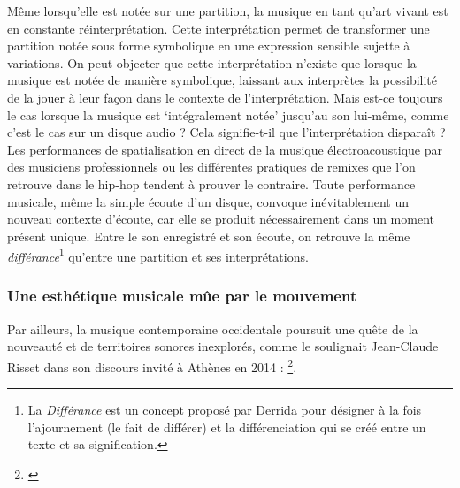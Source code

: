 \noindent Même lorsqu'elle est notée sur une partition, la musique en tant qu'art vivant est en constante réinterprétation. Cette interprétation permet de transformer une partition notée sous forme symbolique en une expression sensible sujette à variations. On peut objecter que cette interprétation n'existe que lorsque la musique est notée de manière symbolique, laissant aux interprètes la possibilité de la jouer à leur façon dans le contexte de l'interprétation. Mais est-ce toujours le cas lorsque la musique est `intégralement notée' jusqu'au son lui-même, comme c'est le cas sur un disque audio ? Cela signifie-t-il que l'interprétation disparaît ? Les performances de spatialisation en direct de la musique électroacoustique par des musiciens professionnels ou les différentes pratiques de remixes que l'on retrouve dans le hip-hop tendent à prouver le contraire. Toute performance musicale, même la simple écoute d'un disque, convoque inévitablement un nouveau contexte d'écoute, car elle se produit nécessairement dans un moment présent unique. Entre le son enregistré et son écoute, on retrouve la même \textit{différance}\footnote{La \textit{Différance} est un concept proposé par Derrida \cite{derrida_lecriture_2014} pour désigner à la fois l'ajournement (le fait de différer) et la différenciation qui se créé entre un texte et sa signification.} qu'entre une partition et ses interprétations.

\subsubsection{Une esthétique musicale mûe par le mouvement}

\noindent Par ailleurs, la musique contemporaine occidentale poursuit une quête de la nouveauté et de territoires sonores inexplorés, comme le soulignait Jean-Claude Risset dans son discours invité à Athènes en 2014 : \footnote{ \cite{risset_sound_2014}}.\\


